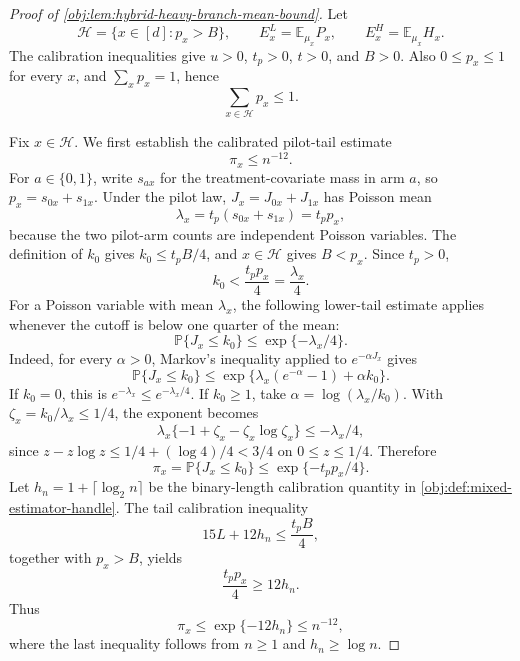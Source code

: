 \documentclass[11pt]{article}
\begin{document}
\begin{proof}[Proof of \cref{obj:lem:hybrid-heavy-branch-mean-bound}]
Let
\[
\mathcal H=\{x\in[d]:p_x>B\},\qquad
E^L_x=\mathbb E_{\mu_x}P_x,\qquad
E^H_x=\mathbb E_{\mu_x}H_x .
\]
The calibration inequalities give \(u>0\), \(t_p>0\), \(t>0\), and \(B>0\). Also \(0\le p_x\le1\) for every \(x\), and \(\sum_xp_x=1\), hence
\[
\sum_{x\in\mathcal H}p_x\le1 .
\]

Fix \(x\in\mathcal H\). We first establish the calibrated pilot-tail estimate
\[
\pi_x\le n^{-12}.
\]
For \(a\in\{0,1\}\), write \(s_{ax}\) for the treatment-covariate mass in arm \(a\), so \(p_x=s_{0x}+s_{1x}\). Under the pilot law, \(J_x=J_{0x}+J_{1x}\) has Poisson mean
\[
\lambda_x=t_p(s_{0x}+s_{1x})=t_pp_x,
\]
because the two pilot-arm counts are independent Poisson variables. The definition of \(k_0\) gives \(k_0\le t_pB/4\), and \(x\in\mathcal H\) gives \(B<p_x\). Since \(t_p>0\),
\[
k_0<\frac{t_pp_x}{4}=\frac{\lambda_x}{4}.
\]
For a Poisson variable with mean \(\lambda_x\), the following lower-tail estimate applies whenever the cutoff is below one quarter of the mean:
\[
\mathbb P\{J_x\le k_0\}\le \exp\{-\lambda_x/4\}.
\]
Indeed, for every \(\alpha>0\), Markov's inequality applied to \(e^{-\alpha J_x}\) gives
\[
\mathbb P\{J_x\le k_0\}
\le
\exp\{\lambda_x(e^{-\alpha}-1)+\alpha k_0\}.
\]
If \(k_0=0\), this is \(e^{-\lambda_x}\le e^{-\lambda_x/4}\). If \(k_0\ge1\), take \(\alpha=\log(\lambda_x/k_0)\). With \(\zeta_x=k_0/\lambda_x\le1/4\), the exponent becomes
\[
\lambda_x\{-1+\zeta_x-\zeta_x\log\zeta_x\}
\le -\lambda_x/4,
\]
since \(z-z\log z\le 1/4+(\log 4)/4<3/4\) on \(0\le z\le1/4\). Therefore
\[
\pi_x=\mathbb P\{J_x\le k_0\}\le \exp\{-t_pp_x/4\}.
\]
Let \(h_n=1+\lceil\log_2 n\rceil\) be the binary-length calibration quantity in \cref{obj:def:mixed-estimator-handle}. The tail calibration inequality
\[
15L+12h_n\le \frac{t_pB}{4},
\]
together with \(p_x>B\), yields
\[
\frac{t_pp_x}{4}\ge 12h_n.
\]
Thus
\[
\pi_x\le \exp\{-12h_n\}\le n^{-12},
\]
where the last inequality follows from \(n\ge1\) and \(h_n\ge \log n\).


\end{proof}
\end{document}

